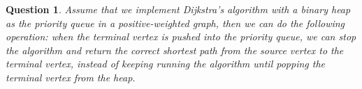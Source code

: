 \documentclass[10.5pt]{article}
\newtheorem{Q}{Question}
\begin{document}
\begin{Q}
	Assume that we implement Dijkstra’s algorithm with a binary heap as the priority queue in a positive-weighted graph, then we can do the following operation: when the terminal vertex is pushed into the priority queue, we can stop the algorithm and return the correct shortest path from the source vertex to the terminal vertex, instead of keeping running the algorithm until popping the terminal vertex from the heap.
	\vspace{4cm}
\end{Q}
\end{document}

